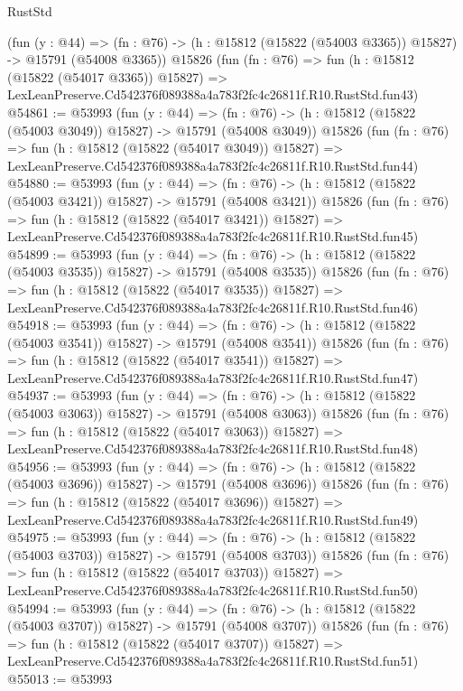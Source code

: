 \begin{lexlean}{RustStd}
\begin{coremodule}
    (fun (y : @44) =>
    (fn : @76) -> (h : @15812 (@15822 (@54003 @3365)) @15827) -> @15791 (@54008 @3365))
    @15826
    (fun (fn : @76) =>
    fun (h : @15812 (@15822 (@54017 @3365)) @15827) =>
    LexLeanPreserve.Cd542376f089388a4a783f2fc4c26811f.R10.RustStd.fun43)
@54861 := @53993
    (fun (y : @44) =>
    (fn : @76) -> (h : @15812 (@15822 (@54003 @3049)) @15827) -> @15791 (@54008 @3049))
    @15826
    (fun (fn : @76) =>
    fun (h : @15812 (@15822 (@54017 @3049)) @15827) =>
    LexLeanPreserve.Cd542376f089388a4a783f2fc4c26811f.R10.RustStd.fun44)
@54880 := @53993
    (fun (y : @44) =>
    (fn : @76) -> (h : @15812 (@15822 (@54003 @3421)) @15827) -> @15791 (@54008 @3421))
    @15826
    (fun (fn : @76) =>
    fun (h : @15812 (@15822 (@54017 @3421)) @15827) =>
    LexLeanPreserve.Cd542376f089388a4a783f2fc4c26811f.R10.RustStd.fun45)
@54899 := @53993
    (fun (y : @44) =>
    (fn : @76) -> (h : @15812 (@15822 (@54003 @3535)) @15827) -> @15791 (@54008 @3535))
    @15826
    (fun (fn : @76) =>
    fun (h : @15812 (@15822 (@54017 @3535)) @15827) =>
    LexLeanPreserve.Cd542376f089388a4a783f2fc4c26811f.R10.RustStd.fun46)
@54918 := @53993
    (fun (y : @44) =>
    (fn : @76) -> (h : @15812 (@15822 (@54003 @3541)) @15827) -> @15791 (@54008 @3541))
    @15826
    (fun (fn : @76) =>
    fun (h : @15812 (@15822 (@54017 @3541)) @15827) =>
    LexLeanPreserve.Cd542376f089388a4a783f2fc4c26811f.R10.RustStd.fun47)
@54937 := @53993
    (fun (y : @44) =>
    (fn : @76) -> (h : @15812 (@15822 (@54003 @3063)) @15827) -> @15791 (@54008 @3063))
    @15826
    (fun (fn : @76) =>
    fun (h : @15812 (@15822 (@54017 @3063)) @15827) =>
    LexLeanPreserve.Cd542376f089388a4a783f2fc4c26811f.R10.RustStd.fun48)
@54956 := @53993
    (fun (y : @44) =>
    (fn : @76) -> (h : @15812 (@15822 (@54003 @3696)) @15827) -> @15791 (@54008 @3696))
    @15826
    (fun (fn : @76) =>
    fun (h : @15812 (@15822 (@54017 @3696)) @15827) =>
    LexLeanPreserve.Cd542376f089388a4a783f2fc4c26811f.R10.RustStd.fun49)
@54975 := @53993
    (fun (y : @44) =>
    (fn : @76) -> (h : @15812 (@15822 (@54003 @3703)) @15827) -> @15791 (@54008 @3703))
    @15826
    (fun (fn : @76) =>
    fun (h : @15812 (@15822 (@54017 @3703)) @15827) =>
    LexLeanPreserve.Cd542376f089388a4a783f2fc4c26811f.R10.RustStd.fun50)
@54994 := @53993
    (fun (y : @44) =>
    (fn : @76) -> (h : @15812 (@15822 (@54003 @3707)) @15827) -> @15791 (@54008 @3707))
    @15826
    (fun (fn : @76) =>
    fun (h : @15812 (@15822 (@54017 @3707)) @15827) =>
    LexLeanPreserve.Cd542376f089388a4a783f2fc4c26811f.R10.RustStd.fun51)
@55013 := @53993

\end{coremodule}
\end{lexlean}
